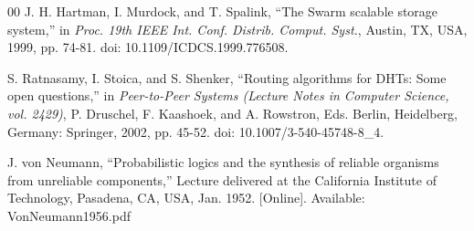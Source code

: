 \documentclass[conference]{IEEEtran}
\begin{document}
\begin{thebibliography}{00}
  J. H. Hartman, I. Murdock, and T. Spalink, ``The Swarm scalable storage system,'' in \emph{Proc. 19th IEEE Int. Conf. Distrib. Comput. Syst.}, Austin, TX, USA, 1999, pp. 74-81. doi: 10.1109/ICDCS.1999.776508.

 S. Ratnasamy, I. Stoica, and S. Shenker, ``Routing algorithms for DHTs: Some open questions,'' in \emph{Peer-to-Peer Systems (Lecture Notes in Computer Science, vol. 2429)}, P. Druschel, F. Kaashoek, and A. Rowstron, Eds. Berlin, Heidelberg, Germany: Springer, 2002, pp. 45-52. doi: 10.1007/3-540-45748-8\_4.

 J. von Neumann, ``Probabilistic logics and the synthesis of reliable organisms from unreliable components,'' Lecture delivered at the California Institute of Technology, Pasadena, CA, USA, Jan. 1952. [Online]. Available: VonNeumann1956.pdf










\end{thebibliography}
\end{document}
